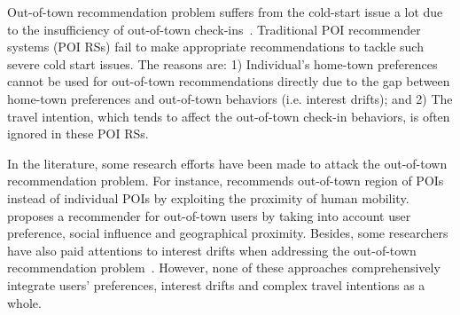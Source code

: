 \documentclass[letterpaper]{article} %
\begin{document}
Out-of-town recommendation problem suffers from the cold-start issue a lot due to the insufficiency of out-of-town check-ins~\cite{ference2013location}.
Traditional POI recommender systems (POI RSs) fail to make appropriate recommendations to tackle such severe cold start issues.
The reasons are:
1) Individual's home-town preferences cannot be used for out-of-town recommendations directly due to the gap between home-town preferences and out-of-town behaviors (i.e. interest drifts);
and 2) The travel intention, which tends to affect the out-of-town check-in behaviors, is often ignored in these POI RSs.

In the literature, some research efforts have been made to attack the out-of-town recommendation problem.
For instance,
\cite{pham2017general} recommends out-of-town region of POIs instead of individual POIs by exploiting the proximity of human mobility.
\cite{ference2013location} proposes a recommender for out-of-town users by taking into account user preference, social influence and geographical proximity.
Besides, some researchers have also paid attentions to interest drifts when addressing the out-of-town recommendation problem~\cite{yin2014lcars,yin2016joint,wang2017location}.
However, none of these approaches comprehensively integrate users' preferences, interest drifts and complex travel intentions as a whole.
\end{document}
